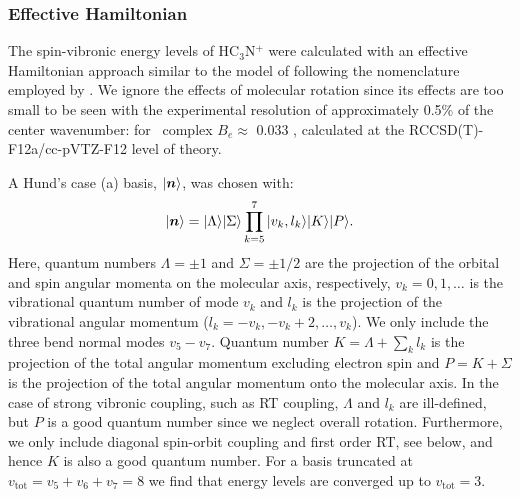 \subsubsection{Effective Hamiltonian}
The spin-vibronic energy levels of HC$_3$N$^+$ were calculated with an effective Hamiltonian approach similar to the model of \citet{He2005} following the nomenclature employed by \citet{Dai2015TheCalculations}.
We ignore the effects of molecular rotation since its effects are too small to be seen with the experimental resolution of approximately 0.5\% of the center wavenumber: for \neion\ complex $B_e \approx $  0.033 \wn, calculated at the RCCSD(T)-F12a/cc-pVTZ-F12 level of theory. 

A Hund's case (a) basis, $| \bm n \rangle$, was chosen with: 
\begin{equation}
    | \bm n \rangle = |\Lambda \rangle |\Sigma \rangle \prod_{k=5}^7 |v_k, l_k \rangle |K \rangle |P \rangle.
    \label{eqn:Basis}
\end{equation}
Here, quantum numbers $\Lambda=\pm 1$ and $\Sigma=\pm 1/2$ are the projection of the orbital and spin angular momenta on the molecular axis, respectively, $v_k=0, 1, \dots$ is the vibrational quantum number of mode $v_k$ and $l_k$ is the projection of the vibrational angular momentum ($l_k=-v_k,-v_k+2,\ldots,v_k$).
We only include the three bend normal modes $v_5-v_7$.
Quantum number $K=\Lambda+\sum_k l_k$ is the projection of the total angular momentum excluding electron spin and $P=K+\Sigma$ is the projection of the total angular momentum onto the molecular axis.
In the case of strong vibronic coupling, such as RT coupling, $\Lambda$ and $l_k$ are ill-defined, but $P$ is a good quantum number since we neglect overall rotation. Furthermore, we only include diagonal spin-orbit coupling and first order RT, see below, and hence $K$ is also a good quantum number.
For a basis truncated at $v_\mathrm{tot}=v_5+v_6+v_7=8$ we find that energy levels are converged up to $v_\mathrm{tot}=3$.

